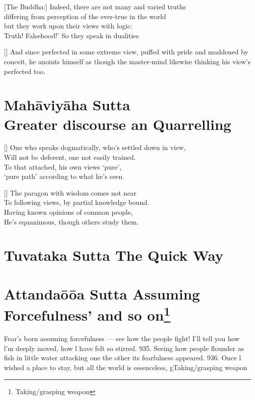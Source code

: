 \begin{MyDescription}{}[The Buddha:]
Indeed, there are not many and varied truths\\
differing from perception of the ever-true in the world\\
but they work upon their views with logic:\\
Truth! Falsehood!' So they speak in dualities
\end{MyDescription}

\begin{MyDescription}{}[]
And since perfected in some extreme view,
puffed with pride and maddened by conceit,
he anoints himself as though the master-mind
likewise thinking his view's perfected too.
\end{MyDescription}

\chapter{Mah\=aviy\=aha Sutta\\ Greater discourse an Quarrelling}

\begin{MyDescription}{}[]
One who speaks dogmatically, who's settled down in view,\\
Will not be deferent, one not easily trained.\\
To that attached, his own views `pure',\\
`pure path' according to what he's seen.
\end{MyDescription}

\begin{MyDescription}{}[]
The paragon with wisdom comes not near\\
To following views, by partial knowledge bound.\\
Having known opinions of common people,\\
He's equanimous, though others study them.
\end{MyDescription}


\chapter{Tuvataka Sutta The Quick Way}

\chapter{Attanda\=o\=oa Sutta Assuming Forcefulness' and so on\footnote{Taking/grasping weapon}}
   Fear's born assuming forcefulness —
   see how the people ﬁght!
   I'll tell you how l'm deeply moved,
   how l have felt so stirred.
   935.
   Seeing how people ﬂounder
   as ﬁsh in little water
   attacking one the other
   its fearfulness appeared.
   936.
   Once l wished a place to stay,
   but all the world is essenceless,
   gTaking/grasping weapon
   
